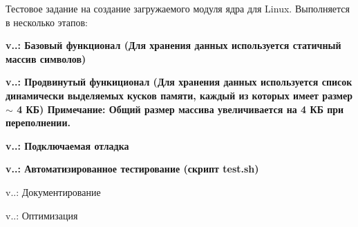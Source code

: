Тестовое задание на создание загружаемого модуля ядра для Linux. Выполняется в несколько этапов\+:
\begin{DoxyItemize}
\item {\bfseries{v..\+: Базовый функционал (Для хранения данных используется статичный массив символов)}}
\item {\bfseries{v..\+: Продвинутый функиционал (Для хранения данных используется список динамически выделяемых кусков памяти, каждый из которых имеет размер $\sim$ 4 КБ) Примечание\+: Общий размер массива увеличивается на 4 КБ при переполнении.}}
\item {\bfseries{v..\+: Подключаемая отладка}}
\item {\bfseries{v..\+: Автоматизированное тестирование (скрипт test.\+sh)}}
\item v..\+: Документирование
\item v..\+: Оптимизация 
\end{DoxyItemize}